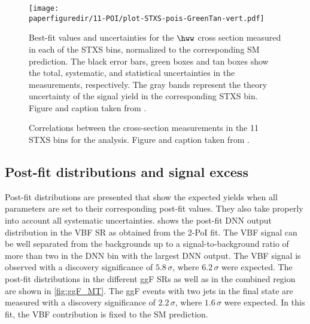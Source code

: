 \begin{figure}[t]
  \centering
  \texttt{[image: \\paperfiguredir/11-POI/plot-STXS-pois-GreenTan-vert.pdf]}
  \caption[Best-fit values and uncertainties for the $\hww$ cross section measured in each of the STXS bins.]{
    Best-fit values and uncertainties for the $\hww$ cross section measured in each of the STXS bins, normalized to the corresponding SM prediction.
    The black error bars, green boxes and tan boxes show the total, systematic, and statistical uncertainties in the measurements, respectively.
    The gray bands represent the theory uncertainty of the signal yield in the corresponding STXS bin.
    Figure and caption taken from .
    \label{fig:11-POI_measurement}
  }
\end{figure}

\begin{figure}[h!]
  \centering
  \scalebox{0.65}{
    
  }
  \caption[Correlations between the 11 STXS cross-section measurements.]{
    Correlations between the cross-section measurements in the 11 STXS bins for the \HWW analysis.
    Figure and caption taken from .
    \label{fig:STXS-correlation}
  }
\end{figure}



\subsection{Post-fit distributions and signal excess}
Post-fit distributions are presented that show the expected yields when all parameters are set to their corresponding post-fit values. They also take properly into account all systematic uncertainties.  shows the post-fit DNN output distribution in the VBF SR as obtained from the 2-PoI fit.
The VBF signal can be well separated from the backgrounds up to a signal-to-background ratio of more than two in the DNN bin with the largest DNN output.
The VBF signal is observed with a discovery significance of $5.8\,\sigma$, where $6.2\,\sigma$ were expected.
The post-fit \mT distributions in the different ggF SRs as well as in the combined region are shown in \cref{fig:ggF_MT}.
The ggF events with two jets in the final state are measured with a discovery significance of $2.2\,\sigma$, where $1.6\,\sigma$ were expected. In this fit, the VBF contribution is fixed to the SM prediction.

